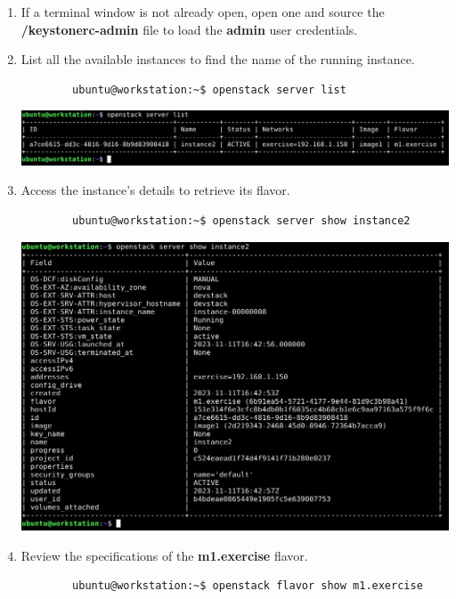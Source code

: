 \documentclass[letterpaper, 12pt]{article}
\begin{document}
\begin{enumerate}
    \item If a terminal window is not already open, open one and source the \textbf{\texttildemid/keystonerc-admin} file
    to load the \textbf{admin} user credentials.

    \item List all the available instances to find the name of the running instance.
    \begin{lstlisting}
        ubuntu@workstation:~$ openstack server list
    \end{lstlisting}

    \begin{center}
        \includegraphics[width=\linewidth]{images/part5/step2.png}
    \end{center}

    \item Access the instance's details to retrieve its flavor.
    \begin{lstlisting}
        ubuntu@workstation:~$ openstack server show instance2
    \end{lstlisting}

    \begin{center}
        \includegraphics[width=\linewidth]{images/part5/step3.png}
    \end{center}

    \item Review the specifications of the \textbf{m1.exercise} flavor.
    \begin{lstlisting}
        ubuntu@workstation:~$ openstack flavor show m1.exercise
    \end{lstlisting}


\end{enumerate}
\end{document}
